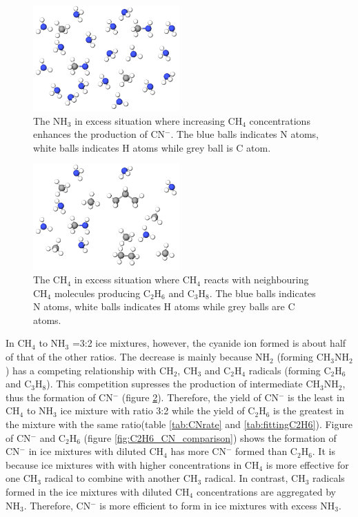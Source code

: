 \begin{figure}
\centering
\includegraphics[width=0.5\textwidth]{figures/ammonia_dominating.png}
\caption{The NH$_3$ in excess situation where increasing CH$_4$ concentrations enhances the production of CN$^-$. The blue balls indicates N atoms, white balls indicates H atoms while grey ball is C atom.}
\label{fig:NH3_dominated}
\end{figure}


\begin{figure}
\centering
\includegraphics[width=0.5\textwidth]{figures/methane_dominating.png}
\caption{The CH$_4$ in excess situation where CH$_4$ reacts with neighbouring CH$_4$ molecules producing C$_2$H$_6$ and C$_3$H$_8$. The blue balls indicates N atoms, white balls indicates H atoms while grey balls are C atoms.}
\label{fig:CH4_dominated}
\end{figure}

In CH$_4$ to NH$_3$ =3:2 ice mixtures, however, the cyanide ion formed is about half of that of the other ratios. The decrease is mainly because NH$_2$ (forming CH$_3$NH$_2$) has a competing relationship with CH$_2$, CH$_3$ and C$_2$H$_4$ radicals (forming C$_2$H$_6$ and C$_3$H$_8$). This competition supresses the production of intermediate CH$_3$NH$_2$, thus the formation of CN$^-$ (figure \ref{fig:CH4_dominated}). Therefore, the yield of CN$^-$ is the least in CH$_4$ to NH$_3$ ice mixture with ratio 3:2 while the yield of C$_2$H$_6$ is the greatest in the mixture with the same ratio(table \ref{tab:CNrate} and \ref{tab:fittingC2H6}). Figure of CN$^-$ and C$_2$H$_6$ (figure \ref{fig:C2H6_CN_comparison}) shows the formation of CN$^-$ in ice mixtures with diluted CH$_4$ has more CN$^-$ formed than C$_2$H$_6$. It is because ice mixtures with with higher concentrations in CH$_4$ is more effective for one CH$_3$ radical to combine with another CH$_3$ radical. In contrast, CH$_3$ radicals formed in the ice mixtures with diluted CH$_4$ concentrations are aggregated by NH$_3$. Therefore, CN$^-$ is more efficient to form in ice mixtures with excess NH$_3$.\\


